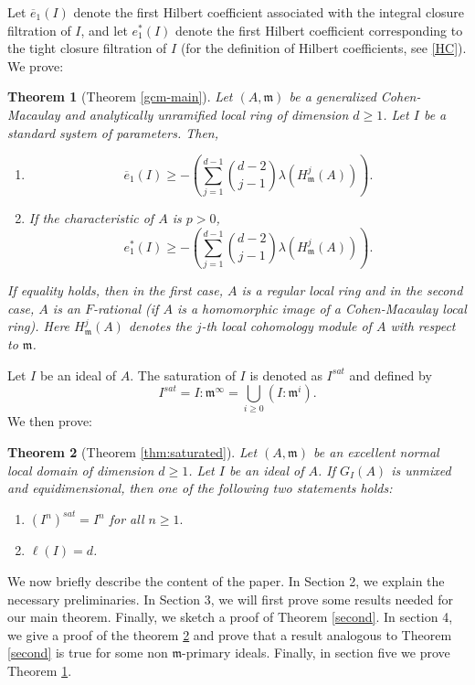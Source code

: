 \documentclass[11pt]{amsart}
\theoremstyle{plain}
\newtheorem{theorem}{Theorem}[section]
\newcommand{\m}{\mathfrak{m}}
\theoremstyle{plain}
\begin{document}
Let $\overline{e}_1(I)$ denote the first Hilbert coefficient associated with the integral closure filtration of $I$, and let $e_1^*(I)$ denote the first Hilbert coefficient corresponding to the tight closure filtration of $I$ (for the definition of Hilbert coefficients, see \ref{HC}). We prove:



\begin{theorem}[Theorem \ref{gcm-main}]\label{gcm-body}
    Let $(A,\m)$ be a generalized Cohen-Macaulay and analytically unramified local ring of dimension $d\geq 1$. Let $I$ be a standard system of parameters. Then,
\begin{enumerate}
     \item $$\overline{e}_1({I}) \geq -\left(\sum_{j=1}^{d-1}\binom{d-2}{j-1}\lambda(H^j_{\m}(A))\right).$$
    \item If the characteristic of $A$ is $p>0$, $$e^*_1(I)\geq -\left(\sum_{j=1}^{d-1}\binom{d-2}{j-1}\lambda(H^j_{\m}(A))\right).$$

\end{enumerate}
   If equality holds, then in the first case, $A$ is a regular local ring and in the second case, $A$ is an $F$-rational (if $A$ is a homomorphic image of a Cohen-Macaulay local ring).  Here $H^j_\m(A)$ denotes the $j$-{th} local cohomology module of $A$ with respect to $\m$.
\end{theorem}


Let $I$ be an ideal of $A$. The saturation of $I$ is denoted as $I^{sat}$ and defined by $$I^{sat}=I:\m^{\infty}=\bigcup_{i\geq 0}(I:\m^i).$$ We then prove:

 \begin{theorem}[Theorem \ref{thm:saturated}]
 \label{third}
      Let $(A,\m)$ be an excellent normal local domain of dimension $d\geq 1$. Let $I$ be an ideal of $A$. If ${G}_{I}(A)$ is unmixed and equidimensional, then one of the following two statements holds:
    \begin{enumerate}[ \rm (1)]
        \item $(I^n)^{sat}=I^n$ for all $n\geq 1.$
        \item $\ell(I)=d$.
    \end{enumerate}
 \end{theorem}

We now briefly describe the content of the paper. In Section 2, we explain the necessary preliminaries. In Section 3, we will first prove some results needed for our main theorem. Finally, we sketch a proof of Theorem \ref{second}. In section 4, we give a proof of the theorem \ref{third} and prove that a result analogous to Theorem \ref{second} is true for some non $\m$-primary ideals. Finally, in section five we prove Theorem \ref{gcm-body}.
\end{document}
